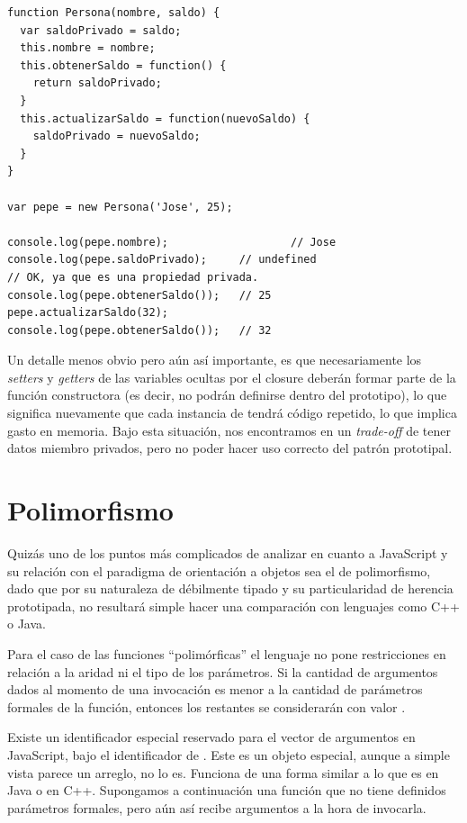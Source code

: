 \begin{lstlisting}[title={Alcanzando variables privadas mediante closures}]
function Persona(nombre, saldo) {
  var saldoPrivado = saldo;
  this.nombre = nombre;
  this.obtenerSaldo = function() {
    return saldoPrivado;
  }
  this.actualizarSaldo = function(nuevoSaldo) {
    saldoPrivado = nuevoSaldo;
  }
}

var pepe = new Persona('Jose', 25);

console.log(pepe.nombre);					// Jose
console.log(pepe.saldoPrivado);		// undefined
// OK, ya que es una propiedad privada.
console.log(pepe.obtenerSaldo());	// 25
pepe.actualizarSaldo(32);
console.log(pepe.obtenerSaldo());	// 32
\end{lstlisting}

Un detalle menos obvio pero aún así importante, es que necesariamente los \textit{setters} y \textit{getters} de las variables ocultas por el closure deberán formar parte de la función constructora (es decir, no podrán definirse dentro del prototipo), lo que significa nuevamente que cada instancia de  tendrá código repetido, lo que implica gasto en memoria. Bajo esta situación, nos encontramos en un \textit{trade-off} de tener datos miembro privados, pero no poder hacer uso correcto del patrón prototipal.

\section{Polimorfismo}

Quizás uno de los puntos más complicados de analizar en cuanto a JavaScript y su relación con el paradigma de orientación a objetos sea el de polimorfismo, dado que por su naturaleza de débilmente tipado y su particularidad de herencia prototipada, no resultará simple hacer una comparación con lenguajes como C++ o Java. 

Para el caso de las funciones "`polimórficas"' el lenguaje no pone restricciones en relación a la aridad ni el tipo de los parámetros. Si la cantidad de argumentos dados al momento de una invocación es menor a la cantidad de parámetros formales de la función, entonces los restantes se considerarán con valor . 

Existe un identificador especial reservado para el vector de argumentos en JavaScript, bajo el identificador de . Este es un objeto especial, aunque a simple vista parece un arreglo, no lo es. Funciona de una forma similar a lo que es  en Java o  en C++. Supongamos a continuación una función que no tiene definidos parámetros formales, pero aún así recibe argumentos a la hora de invocarla.

